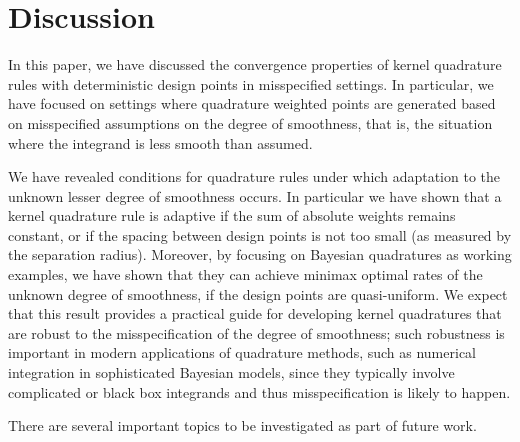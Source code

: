 \documentclass[11pt]{article}
\theoremstyle{remark}
\theoremstyle{example}
\theoremstyle{remark}
\begin{document}
\section{Discussion}
\label{sec:conclude}
In this paper, we have discussed the convergence properties of kernel quadrature rules with deterministic design points in misspecified settings.
In particular, we have focused on settings where quadrature weighted points are generated based on misspecified assumptions on the degree of smoothness, that is, the situation where the integrand is less smooth than assumed.

We have revealed conditions for quadrature rules under which adaptation to the unknown lesser degree of smoothness occurs. 
In particular we have shown that a kernel quadrature rule is adaptive if the sum of absolute weights remains constant, or if the spacing between design points is not too small (as measured by the separation radius).
Moreover, by focusing on Bayesian quadratures as working examples, we have shown that they can achieve minimax optimal rates of the unknown degree of smoothness, if the design points are quasi-uniform.
We expect that this result provides a practical guide for developing kernel quadratures that are robust to the misspecification of the degree of smoothness; such robustness is important in modern applications of quadrature methods, such as numerical integration in sophisticated Bayesian models, since they typically involve complicated or black box integrands and thus misspecification is likely to happen.\vspace{1mm}

There are several important topics to be investigated as part of future work.\vspace{-4mm}
\end{document}
